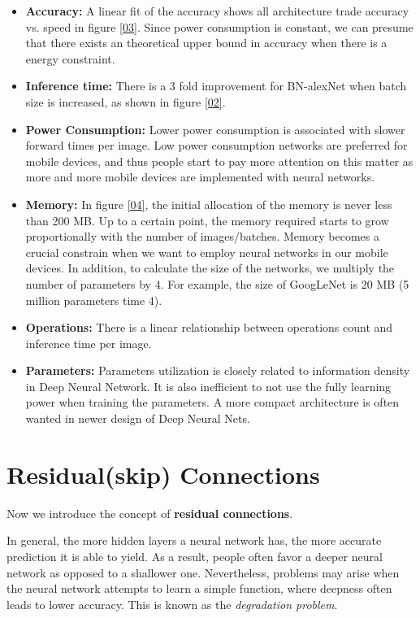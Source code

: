 \begin{itemize}
    \item \textbf{Accuracy:} A linear fit of the accuracy shows all architecture trade accuracy vs. speed in figure \ref{03}. Since power consumption is constant, we can presume that there exists an theoretical upper bound in accuracy when there is a energy constraint.
    \item \textbf{Inference time:} There is a 3 fold improvement for BN-alexNet when batch size is increased, as shown in figure \ref{02}. 
    \item \textbf{Power Consumption:} Lower power consumption is associated with slower forward times per image. Low power consumption networks are preferred for mobile devices, and thus people start to pay more attention on this matter as more and more mobile devices are implemented with neural networks.
    \item \textbf{Memory:} In figure \ref{04}, the initial allocation of the memory is never less than 200 MB. Up to a certain point, the memory required starts to grow proportionally with the number of images/batches. Memory becomes a crucial constrain when we want to employ neural networks in our mobile devices. In addition, to calculate the size of the networks, we multiply the number of parameters by 4. For example, the size of GoogLeNet is 20 MB (5 million parameters time 4).
    \item \textbf{Operations:} There is a linear relationship between operations count and inference time per image.
    \item \textbf{Parameters:} Parameters utilization is closely related to information density in Deep Neural Network. It is also inefficient to not use the fully learning power when training the parameters. A more compact architecture is often wanted in newer design of Deep Neural Nets. 
\end{itemize}
\section{Residual(skip) Connections}

Now we introduce the concept of \textbf{residual connections}.

In general, the more hidden layers a neural network has, the more accurate prediction it is able to yield. As a result, people often favor a deeper neural network as opposed to a shallower one. Nevertheless, problems may arise when the neural network attempts to learn a simple function, where deepness often leads to lower accuracy. This is known as the \textit{degradation problem}.

